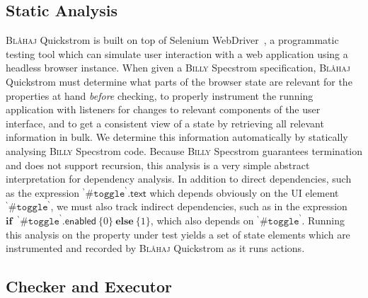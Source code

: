 \documentclass[sigplan,nonacm,10pt]{acmart}
\makeatletter
\newcommand{\Quickstrom}[0]{%
  \if@ACM@anonymous%
  \textsc{Bl\aa{}haj}%
  \else%
  Quickstrom%
  \fi\xspace}
\newcommand{\Specstrom}[0]{%
  \if@ACM@anonymous%
  \textsc{Billy}%
  \else%
  Specstrom%
  \fi\xspace}
\makeatother
\begin{document}
 \subsection{Static Analysis}\label{ssec:staticanalysis}
\Quickstrom is built on top of Selenium WebDriver~\citep{selenium}, a programmatic testing tool which can simulate user interaction with a web application using a headless browser instance.
When given a \Specstrom specification, \Quickstrom must determine what parts of the browser state are relevant for the properties at hand \emph{before} checking, to properly instrument the running application with listeners for
changes to relevant components of the user interface, and to get a consistent view of a state by retrieving all relevant information in bulk. We determine this information automatically by statically
analysing \Specstrom code. Because \Specstrom guarantees termination and does not support recursion, this analysis is a very simple abstract interpretation for dependency analysis. In addition to direct dependencies,
such as the expression ${}^\backprime\texttt{\#toggle}^\backprime.\mathsf{text}$ which depends obviously on the UI element ${}^\backprime\texttt{\#toggle}^\backprime$, we must also track indirect dependencies, such as in the
expression
$\textbf{if}\ \; \!{}^\backprime\texttt{\#toggle}^\backprime.\mathsf{enabled}\ \{ 0 \}\ \textbf{else}\ \{ 1 \}$, which also depends on ${}^\backprime\texttt{\#toggle}^\backprime$. Running this analysis on the property under test
yields a set of state elements which are instrumented and recorded by \Quickstrom as it runs actions.



\subsection{Checker and Executor}
\end{document}
